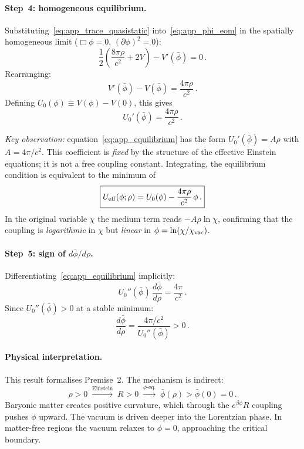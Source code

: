 \documentclass[11pt,a4paper]{article}
\numberwithin{equation}{section}
\begin{document}
\paragraph{Step~4: homogeneous equilibrium.}
Substituting~\eqref{eq:app_trace_quasistatic}
into~\eqref{eq:app_phi_eom} in the spatially homogeneous
limit ($\Box\phi = 0$, $(\partial\phi)^2 = 0$):
\begin{equation}
\frac{1}{2}\left(\frac{8\pi\rho}{c^2} + 2V\right)
- V'(\bar\phi) = 0\,.
\end{equation}
Rearranging:
\begin{equation}
V'(\bar\phi) - V(\bar\phi) = \frac{4\pi\rho}{c^2}\,.
\label{eq:app_balance}
\end{equation}
Defining $U_0(\phi) \equiv V(\phi) - V(0)$, this gives
\begin{equation}
U_0'(\bar\phi) = \frac{4\pi\rho}{c^2}\,.
\label{eq:app_equilibrium}
\end{equation}

\emph{Key observation:} equation~\eqref{eq:app_equilibrium} has
the form $U_0'(\bar\phi) = A\rho$ with
$A = 4\pi/c^2$. This coefficient is \emph{fixed} by the
structure of the effective Einstein equations; it is not a free
coupling constant. Integrating, the equilibrium condition is
equivalent to the minimum of
\begin{equation}
\boxed{
U_{\rm eff}(\phi;\rho)
= U_0(\phi) - \frac{4\pi\rho}{c^2}\,\phi\,.
}
\label{eq:app_Ueff}
\end{equation}
In the original variable $\chi$ the medium term reads
$-A\rho\ln\chi$, confirming that the coupling is
\emph{logarithmic} in $\chi$ but \emph{linear} in
$\phi = \ln(\chi/\chi_{\rm vac})$.

\paragraph{Step~5: sign of $d\bar\phi/d\rho$.}
Differentiating~\eqref{eq:app_equilibrium} implicitly:
\begin{equation}
U_0''(\bar\phi)\,\frac{d\bar\phi}{d\rho}
= \frac{4\pi}{c^2}\,.
\end{equation}
Since $U_0''(\bar\phi) > 0$ at a stable minimum:
\begin{equation}
\boxed{
\frac{d\bar\phi}{d\rho}
= \frac{4\pi/c^2}{U_0''(\bar\phi)} > 0\,.
}
\label{eq:app_sign}
\end{equation}

\paragraph{Physical interpretation.}
This result formalises Premise~2. The mechanism is indirect:
\begin{equation}
\rho > 0
\;\xrightarrow{\text{Einstein}}\;
R > 0
\;\xrightarrow{\phi\text{-eq.}}\;
\bar\phi(\rho) > \bar\phi(0) = 0\,.
\end{equation}
Baryonic matter creates positive curvature, which through the
$e^{\beta\phi} R$ coupling pushes $\phi$ upward. The vacuum is driven
deeper into the Lorentzian phase. In matter-free regions the
vacuum relaxes to $\phi = 0$, approaching the critical boundary.
\end{document}
